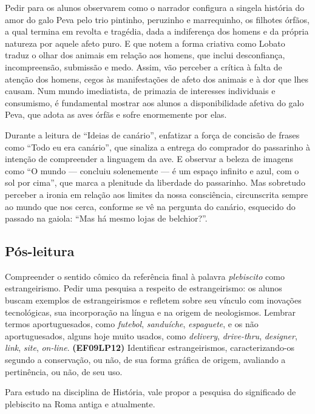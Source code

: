 Pedir para os alunos observarem como o narrador configura a singela
história do amor do galo Peva pelo trio pintinho, peruzinho e
marrequinho, os filhotes órfãos, a qual termina em revolta e tragédia,
dada a indiferença dos homens e da própria natureza por aquele afeto
puro. E que notem a forma criativa como Lobato traduz o olhar dos
animais em relação aos homens, que inclui desconfiança, incompreensão,
submissão e medo. Assim, vão perceber a crítica à falta de atenção dos
homens, cegos às manifestações de afeto dos animais e à dor que lhes
causam. Num mundo imediatista, de primazia de interesses individuais e
consumismo, é fundamental mostrar aos alunos a disponibilidade afetiva
do galo Peva, que adota as aves órfãs e sofre enormemente por elas.

Durante a leitura de ``Ideias de canário'', enfatizar a força de
concisão de frases como ``Todo eu era canário'', que sinaliza a entrega
do comprador do passarinho à intenção de compreender a linguagem da ave.
E observar a beleza de imagens como ``O mundo --- concluiu solenemente
--- é um espaço infinito e azul, com o sol por cima'', que marca a
plenitude da liberdade do passarinho. Mas sobretudo perceber a ironia em
relação aos limites da nossa consciência, circunscrita sempre ao mundo
que nos cerca, conforme se vê na pergunta do canário, esquecido do
passado na gaiola: ``Mas há mesmo lojas de belchior?''.

\subsection{Pós-leitura}

Compreender o sentido cômico da referência final à palavra
\emph{plebiscito} como estrangeirismo. Pedir uma pesquisa a respeito de
estrangeirismo: os alunos buscam exemplos de estrangeirismos e refletem
sobre seu vínculo com inovações tecnológicas, sua incorporação na língua
e na origem de neologismos. Lembrar termos aportuguesados, como
\emph{futebol}, \emph{sanduíche}, \emph{espaguete}, e os não
aportuguesados, alguns hoje muito usados, como \emph{delivery},
\emph{drive-thru}, \emph{designer}, \emph{link}, \emph{site},
\emph{on-line}. \textbf{(EF09LP12)} Identificar estrangeirismos,
caracterizando-os segundo a conservação, ou não, de sua forma gráfica de
origem, avaliando a pertinência, ou não, de seu uso.

Para estudo na disciplina de História, vale propor a pesquisa do
significado de plebiscito na Roma antiga e atualmente.

